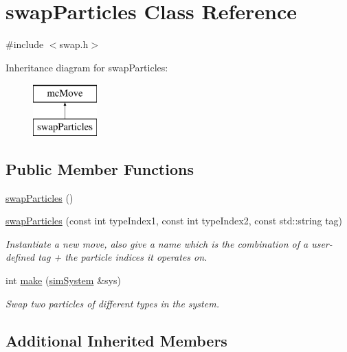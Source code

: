 \hypertarget{classswap_particles}{}\section{swap\+Particles Class Reference}
\label{classswap_particles}


{\ttfamily \#include $<$swap.\+h$>$}

Inheritance diagram for swap\+Particles\+:\begin{figure}[H]
\begin{center}
\leavevmode
\includegraphics[height=2.000000cm]{classswap_particles}
\end{center}
\end{figure}
\subsection*{Public Member Functions}
\begin{DoxyCompactItemize}
\item 
\hyperlink{classswap_particles_a1c476913d5b129db6daf5a1a1a5dd209}{swap\+Particles} ()
\item 
\hyperlink{classswap_particles_aac7a7fb48c4ffd3809221fac7a7800a5}{swap\+Particles} (const int type\+Index1, const int type\+Index2, const std\+::string tag)
\begin{DoxyCompactList}\small\item\em Instantiate a new move, also give a name which is the combination of a user-\/defined tag + the particle indices it operates on. \end{DoxyCompactList}\item 
int \hyperlink{classswap_particles_ad8ca574f8e5308b6f0a5f3c7c2799209}{make} (\hyperlink{classsim_system}{sim\+System} \&sys)
\begin{DoxyCompactList}\small\item\em Swap two particles of different types in the system. \end{DoxyCompactList}\end{DoxyCompactItemize}
\subsection*{Additional Inherited Members}


